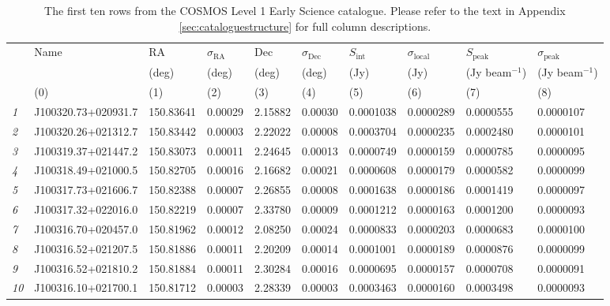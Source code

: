 \documentclass[usenatbib,usedcolumn]{mnras}
\begin{document}
\begin{table*}
\begin{minipage}{176mm}
\centering
\caption{The first ten rows from the COSMOS Level 1 Early Science catalogue. Please refer to the text in Appendix \ref{sec:cataloguestructure} for full column descriptions.}
\label{tab:tenrows}
\begin{tabular}{llllllllll} \hline
 & Name & RA & $\sigma_{\mathrm{RA}}$ & Dec & $\sigma_{\mathrm{Dec}}$ & $S_{\mathrm{int}}$ & $\sigma_{\mathrm{local}}$ & $S_{\mathrm{peak}}$ & $\sigma_{\mathrm{peak}}$ \\
 & & (deg) & (deg) & (deg) & (deg) & (Jy) & (Jy) & (Jy beam$^{-1}$) & (Jy beam$^{-1}$) \\
 & (0) & (1) & (2) & (3) & (4) & (5) & (6) & (7) & (8) \\ \hline
\textcolor{mygray}{\emph{1}} & J100320.73+020931.7 & 150.83641 & 0.00029 & 2.15882 & 0.00030 & 0.0001038 & 0.0000289 & 0.0000555 & 0.0000107 \\
\textcolor{mygray}{\emph{2}} & J100320.26+021312.7 & 150.83442 & 0.00003 & 2.22022 & 0.00008 & 0.0003704 & 0.0000235 & 0.0002480 & 0.0000101 \\
\textcolor{mygray}{\emph{3}} & J100319.37+021447.2 & 150.83073 & 0.00011 & 2.24645 & 0.00013 & 0.0000749 & 0.0000159 & 0.0000785 & 0.0000095 \\
\textcolor{mygray}{\emph{4}} & J100318.49+021000.5 & 150.82705 & 0.00016 & 2.16682 & 0.00021 & 0.0000608 & 0.0000179 & 0.0000582 & 0.0000099 \\
\textcolor{mygray}{\emph{5}} & J100317.73+021606.7 & 150.82388 & 0.00007 & 2.26855 & 0.00008 & 0.0001638 & 0.0000186 & 0.0001419 & 0.0000097 \\
\textcolor{mygray}{\emph{6}} & J100317.32+022016.0 & 150.82219 & 0.00007 & 2.33780 & 0.00009 & 0.0001212 & 0.0000163 & 0.0001200 & 0.0000093 \\
\textcolor{mygray}{\emph{7}} & J100316.70+020457.0 & 150.81962 & 0.00012 & 2.08250 & 0.00024 & 0.0000833 & 0.0000203 & 0.0000683 & 0.0000100 \\
\textcolor{mygray}{\emph{8}} & J100316.52+021207.5 & 150.81886 & 0.00011 & 2.20209 & 0.00014 & 0.0001001 & 0.0000189 & 0.0000876 & 0.0000099 \\
\textcolor{mygray}{\emph{9}} & J100316.52+021810.2 & 150.81884 & 0.00011 & 2.30284 & 0.00016 & 0.0000695 & 0.0000157 & 0.0000708 & 0.0000091 \\
\textcolor{mygray}{\emph{10}} & J100316.10+021700.1 & 150.81712 & 0.00003 & 2.28339 & 0.00003 & 0.0003463 & 0.0000160 & 0.0003498 & 0.0000093 \\
\hline
\end{tabular}
\vspace{2mm}


\end{minipage}
\end{table*}
\end{document}
